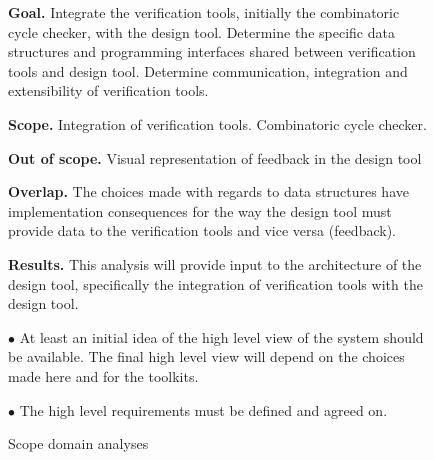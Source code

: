 \begin{figure}[!ht]
{\begin{boxedminipage}[b]{.32\textwidth}
{	    %
	    \par{\bf Goal.}
	    Integrate the verification tools, initially the
	    combinatoric cycle checker, with the design tool. Determine the specific
	    data structures and programming interfaces shared between verification tools
	    and design tool. Determine communication, integration and extensibility of
	    verification tools.
	    \par{\bf Scope.}
	    Integration of verification tools. Combinatoric cycle checker.
	    \par{\bf Out of scope.}
	    Visual representation of feedback in the design tool
	    \par{\bf Overlap.}
	    The choices made with regards to data structures have
	    implementation consequences for the way the design tool must provide data to the
	    verification tools and vice versa (feedback).
	    \par{\bf Results.}
	    This analysis will provide input to the architecture of the
	    design tool, specifically the integration of verification tools with the design
	    tool.
	}%
    \end{boxedminipage}
    }%

    \begin{boxedminipage}[c]{.98\textwidth}
	\par$\bullet$ At least an initial idea of the high level view of the system
		should be available. The final high level
		view will depend on the choices made here and for the toolkits.
	\par$\bullet$ The high level requirements must be defined and agreed on.
    \end{boxedminipage}


    \caption{Scope domain analyses}
    \label{fig: domain-analysis}
\end{figure}
